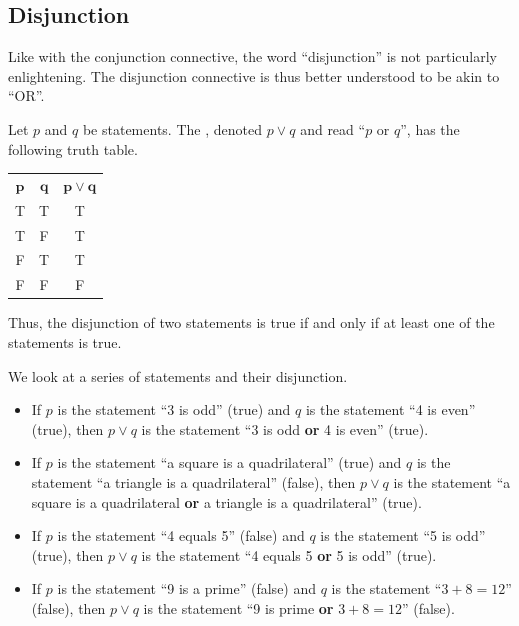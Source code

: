 \subsection{Disjunction}
Like with the conjunction connective, the word ``disjunction'' is not particularly enlightening. The disjunction connective is thus better understood to be akin to ``OR''.

\begin{definition}[Disjunction]
    Let $p$ and $q$ be statements. The , denoted $p \lor q$ and read ``$p$ or $q$'', has the following truth table.
    \begin{table}[H]
        \centering
        \begin{tabular}{|c|c||c|}
            \hline
            $\boldsymbol{p}$ & $\boldsymbol{q}$ & $\boldsymbol{p \lor q}$ \\ \hhline{|=|=#=|}
            T & T & T \\ \hline
            T & F & T \\ \hline
            F & T & T \\ \hline
            F & F & F \\ \hline
        \end{tabular}
    \end{table}
\end{definition}

Thus, the disjunction of two statements is true if and only if at least one of the statements is true.

\begin{example}
    We look at a series of statements and their disjunction.
    \begin{itemize}
        \item If $p$ is the statement ``3 is odd'' (true) and $q$ is the statement ``4 is even'' (true), then $p \lor q$ is the statement ``3 is odd \textbf{or} 4 is even'' (true).
        \item If $p$ is the statement ``a square is a quadrilateral'' (true) and $q$ is the statement ``a triangle is a quadrilateral'' (false), then $p \lor q$ is the statement ``a square is a quadrilateral \textbf{or} a triangle is a quadrilateral'' (true).
        \item If $p$ is the statement ``4 equals 5'' (false) and $q$ is the statement ``5 is odd'' (true), then $p \lor q$ is the statement ``4 equals 5 \textbf{or} 5 is odd'' (true).
        \item If $p$ is the statement ``9 is a prime'' (false) and $q$ is the statement ``$3 + 8 = 12$'' (false), then $p \lor q$ is the statement ``9 is prime \textbf{or} $3 + 8 = 12$'' (false).
    \end{itemize}
\end{example}

